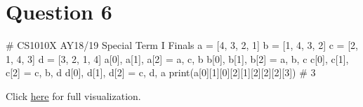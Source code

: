 \newpage

\section{Question 6}
\begin{python}
# CS1010X AY18/19 Special Term I Finals
a = [4, 3, 2, 1]
b = [1, 4, 3, 2]
c = [2, 1, 4, 3]
d = [3, 2, 1, 4]
a[0], a[1], a[2] = a, c, b
b[0], b[1], b[2] = a, b, c
c[0], c[1], c[2] = c, b, d
d[0], d[1], d[2] = c, d, a
print(a[0][1][0][2][1][2][2][2][3]) # 3
\end{python}
Click \href{https://pythontutor.com/visualize.html#code=a%20%3D%20%5B4,%203,%202,%201%5D%0Ab%20%3D%20%5B1,%204,%203,%202%5D%0Ac%20%3D%20%5B2,%201,%204,%203%5D%0Ad%20%3D%20%5B3,%202,%201,%204%5D%0Aa%5B0%5D,%20a%5B1%5D,%20a%5B2%5D%20%3D%20a,%20c,%20b%0Ab%5B0%5D,%20b%5B1%5D,%20b%5B2%5D%20%3D%20a,%20b,%20c%0Ac%5B0%5D,%20c%5B1%5D,%20c%5B2%5D%20%3D%20c,%20b,%20d%0Ad%5B0%5D,%20d%5B1%5D,%20d%5B2%5D%20%3D%20c,%20d,%20a%0Aprint%28a%5B0%5D%5B1%5D%5B0%5D%5B2%5D%5B1%5D%5B2%5D%5B2%5D%5B2%5D%5B3%5D%29&cumulative=false&curInstr=9&heapPrimitives=nevernest&mode=display&origin=opt-frontend.js&py=3&rawInputLstJSON=%5B%5D&textReferences=false}{\underline{here}} for full visualization.

